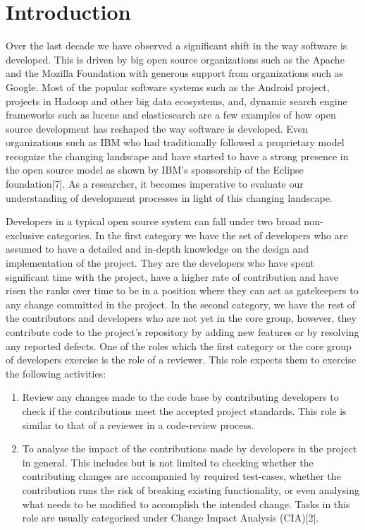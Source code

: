 
\section{Introduction}
\label{sec:intro}

Over the last decade we have observed a significant shift in the way software is developed. This is driven by big open source organizations such as the Apache and the Mozilla Foundation with generous support from organizations such as Google. Most of the popular software systems such as the Android project, projects in Hadoop and other big data ecosystems, and, dynamic search engine frameworks such as lucene and elasticsearch are a few examples of how open source development has reshaped the way software is developed. Even organizations such as IBM who had traditionally followed a proprietary model recognize the changing landscape and have started to have a strong presence in the open source model as shown by IBM's sponsorship of the Eclipse foundation[7]. As a researcher, it becomes imperative to evaluate our understanding of development processes in light of this changing landscape.

Developers in a typical open source system can fall under two broad non-exclusive categories. In the first category we have the set of developers who are assumed to have a detailed and in-depth knowledge on the design and implementation of the project. They are the developers who have spent significant time with the project, have a higher rate of contribution and have risen the ranks over time to be in a position where they can act as gatekeepers to any change committed in the project. In the second category, we have the rest of the contributors and developers who are not yet in the core group, however, they contribute code to the project's repository by adding new features or by resolving any reported defects. One of the roles which the first category or the core group of developers exercise is the role of a reviewer. This role expects them to exercise the following activities:\\
\begin{enumerate}
\item Review any changes made to the code base by contributing developers to check if the contributions meet the accepted project standards. This role is similar to that of a reviewer in a code-review process.
\item To analyse the impact of the contributions made by developers in the project in general. This includes but is not limited to checking whether the contributing changes are accompanied by required test-cases, whether the contribution runs the risk of breaking existing functionality, or even analysing what needs to be modified to accomplish the intended change. Tasks in this role are usually categorised under Change Impact Analysis (CIA)[2].
\end{enumerate}

